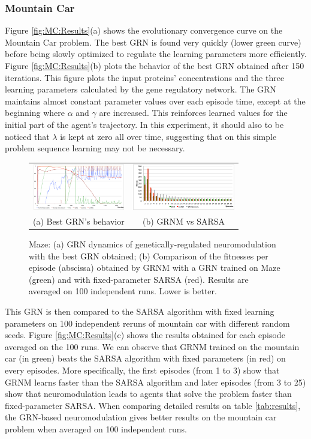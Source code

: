 \subsubsection{Mountain Car}
Figure \ref{fig:MC:Results}(a) shows the evolutionary convergence curve on the Mountain Car problem. The best GRN is found very quickly (lower green curve) before being slowly optimized to regulate the learning parameters more efficiently. Figure \ref{fig:MC:Results}(b) plots the behavior of the best GRN obtained after 150 iterations. This figure plots the input proteins' concentrations and the three learning parameters calculated by the gene regulatory network. The GRN maintains almost constant parameter values over each episode time, except at the beginning where $\alpha$ and $\gamma$ are increased. This reinforces learned values for the initial part of the agent's trajectory. In this experiment, it should also to be noticed that $\lambda$ is kept at zero all over time, suggesting that on this simple problem sequence learning may not be necessary.

\begin{figure}[b!]
\setlength{\tabcolsep}{0.5mm}
\begin{tabular}{cc}
\includegraphics[height=2cm]{MZ_GRNBehavior.pdf}&
\includegraphics[height=2cm]{MZ_GRNvsSARSA.pdf}\\
(a) Best GRN's behavior &
(b) GRNM vs SARSA
\end{tabular}
\caption{Maze: (a) GRN dynamics of genetically-regulated neuromodulation with the best GRN obtained; (b) Comparison of the fitnesses per episode (abscissa) obtained by GRNM with a GRN trained on Maze (green) and with fixed-parameter SARSA (red). Results are averaged on 100 independent runs. Lower is better.}\label{fig:MZ:Results}
\end{figure}

This GRN is then compared to the SARSA algorithm with fixed learning parameters on 100 independent reruns of mountain car with different random seeds. Figure \ref{fig:MC:Results}(c) shows the results obtained for each episode averaged on the 100 runs. We can observe that GRNM trained on the mountain car (in green) beats the SARSA algorithm with fixed parameters (in red) on every episodes. More specifically, the first episodes (from 1 to 3) show that GRNM learns faster than the SARSA algorithm and later episodes (from 3 to 25) show that neuromodulation leads to agents that solve the problem faster than fixed-parameter SARSA. When comparing detailed results on table \ref{tab:results}, the GRN-based neuromodulation gives better results on the mountain car problem when averaged on 100 independent runs. 

